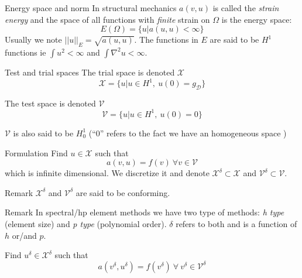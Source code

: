 \begin{frame}{Energy space and norm}
  In structural mechanics $a(v,u)$ is called the \emph{strain energy} and the space of all functions with \emph{finite} strain on $\Omega$ is the energy space:
  \begin{equation}
    \label{eq:23}
    E(\Omega) = \{u | a(u,u) < \infty \}
  \end{equation}
  Usually we note $||u||_E = \sqrt{a(u,u)}$. The functions in $E$ are
  said to be $H^1$ functions ie $\int u^2 < \infty$ and $\int \nabla^2 u <
  \infty$.
\end{frame}

\begin{frame}{Test and trial spaces}
  The trial space  is denoted $\mathcal{X}$
  \begin{equation}
    \label{eq:24}
    \mathcal{X} = \{ u | u \in H^1,\ u(0) = g_{\mathcal{D}}\}
  \end{equation}

  The test space  is denoted $\mathcal{V}$
  \begin{equation}
    \label{eq:25}
    \mathcal{V} = \{ u | u \in H^1,\ u(0) = 0 \}
  \end{equation}
  
  $\mathcal{V}$ is also said to be $H^1_0$ (``0'' refers to the fact we have an homogeneous space )
\end{frame}

\begin{frame}{Formulation}
  Find $u \in \mathcal{X}$ such that 
  \begin{equation}
    \label{eq:26}
    a(v, u) = f(v)\ \forall v \in \mathcal{V}
  \end{equation}
  which is infinite dimensional. We  discretize it and denote
  $\mathcal{X}^{\delta} \subset \mathcal{X}$ and $\mathcal{V}^{\delta}
  \subset \mathcal{V}$.

  \begin{block}{Remark}
    $\mathcal{X}^\delta$ and $\mathcal{V}^\delta$ are said to be conforming.
  \end{block}

  \begin{block}{Remark}
  In spectral/hp element methods we have two type of methods: \emph{h
    type} (element size) and \emph{p type} (polynomial
  order). $\delta$ refers to both and is a function of $h$ or/and $p$.
  \end{block}

  Find $u^\delta \in \mathcal{X}^\delta$ such that
  \begin{equation}
    \label{eq:27}
    a(v^\delta, u^\delta) = f(v^\delta)\ \forall\ v^\delta \in \mathcal{V}^\delta
  \end{equation}
\end{frame}

